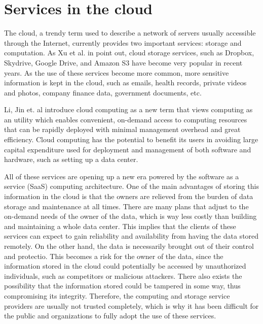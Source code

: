 \section{Services in the cloud}

The cloud, a trendy term used to describe a network of servers usually accessible through the Internet, currently provides two important services: storage and computation. As Xu et al. in \cite{cryptoeprint:2011:574} point out, cloud storage services, such as Dropbox, Skydrive, Google Drive, and Amazon S3 have become very popular in recent years. As the use of these services become more common, more sensitive information is kept in the cloud, such as emails, health records, private videos and photos, company finance data, government documents, etc. 

Li, Jin et. al \cite{cryptoeprint:2009:593} introduce cloud computing as a new term that views computing as an utility which enables convenient, on-demand access to computing resources that can be rapidly deployed with minimal management overhead and great efficiency. Cloud computing has the potential to benefit its users in avoiding large capital expenditure used for deployment and management of both software and hardware, such as setting up a data center. 

All of these services are opening up a new era powered by the software as a service (SaaS) computing architecture. One of the main advantages of storing this information in the cloud is that the owners are relieved from the burden of data storage and maintenance at all times. There are many plans that adjust to the on-demand needs of the owner of the data, which is way less costly than building and maintaining a whole data center. This implies that the clients of these services can expect to gain reliability and availability from having the data stored remotely. On the other hand, the data is necessarily brought out of their control and protectio. This becomes a risk for the owner of the data, since the information stored in the cloud could potentially be accessed by unauthorized individuals, such as competitors or malicious attackers. There also exists the possibility that the information stored could be tampered in some way, thus compromising its integrity. Therefore, the computing and storage service providers are usually not trusted completely, which is why it has been difficult for the public and organizations to fully adopt the use of these services.

